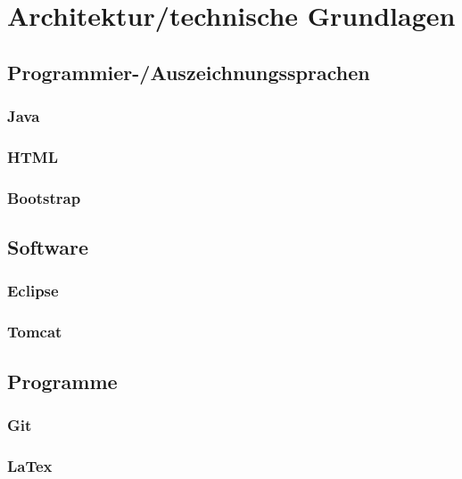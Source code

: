 \clearpage
\chapter{Architektur/technische Grundlagen}

\section{Programmier-/Auszeichnungssprachen}
\subsection{Java}
\subsection{HTML}
\subsection{Bootstrap}


\section{Software}
\subsection{Eclipse}
\subsection{Tomcat}

\section{Programme}
\subsection{Git}
\subsection{LaTex}